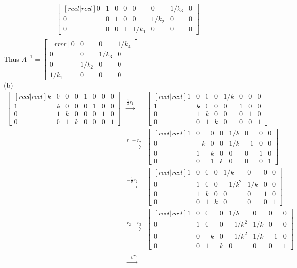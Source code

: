\begin{solution}
\begin{eqnarray*}
\begin{bmatrix}[rccl|rccl]
0&1&0&0&0&0&1/k_3&0\\
0&0&1&0&0&1/k_2&0&0\\
0&0&0&1&1/k_1&0&0&0
\end{bmatrix}\\
\end{eqnarray*}
Thus $A^{-1}=\begin{bmatrix}[rrrr]
0&0&0&1/k_4\\
0&0&1/k_3&0\\
0&1/k_2&0&0\\
1/k_1&0&0&0
\end{bmatrix}
$
\ \\
(b)
\begin{eqnarray*}
\begin{bmatrix}[rccl|rccl]
k&0&0&0&1&0&0&0\\
1&k&0&0&0&1&0&0\\
0&1&k&0&0&0&1&0\\
0&0&1&k&0&0&0&1
\end{bmatrix}
&\xrightarrow[]{\frac{1}{k}r_1}&
\begin{bmatrix}[rccl|rccl]
1&0&0&0&1/k&0&0&0\\
1&k&0&0&0&1&0&0\\
0&1&k&0&0&0&1&0\\
0&0&1&k&0&0&0&1
\end{bmatrix}\\
&\xrightarrow[]{r_1 - r_2}&
\begin{bmatrix}[rccl|rccl]
1&0&0&0&1/k&0&0&0\\
0&-k&0&0&1/k&-1&0&0\\
0&1&k&0&0&0&1&0\\
0&0&1&k&0&0&0&1
\end{bmatrix}\\
&\xrightarrow[]{-\frac{1}{k}r_2}&
\begin{bmatrix}[rccl|rccl]
1&0&0&0&1/k&0&0&0\\
0&1&0&0&-1/k^2&1/k&0&0\\
0&1&k&0&0&0&1&0\\
0&0&1&k&0&0&0&1
\end{bmatrix}\\
&\xrightarrow[]{r_2 - r_3}&
\begin{bmatrix}[rccl|rccl]
1&0&0&0&1/k&0&0&0\\
0&1&0&0&-1/k^2&1/k&0&0\\
0&0&-k&0&-1/k^2&1/k&-1&0\\
0&0&1&k&0&0&0&1
\end{bmatrix}\\
&\xrightarrow[]{-\frac{1}{k}r_3}&

\end{eqnarray*}
\end{solution}
